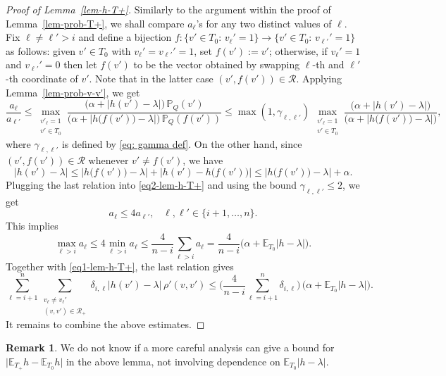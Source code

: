 \documentclass[12pt]{article}
\theoremstyle{definition}
\newtheorem{Remark}[theorem]{Remark}
\theoremstyle{plain}
\newcommand{\E}{\mathbb{E}}
\def\Prob{{\mathbb P}}
\def\relation{{\mathcal R}}
\begin{document}
\begin{proof}[Proof of Lemma~\ref{lem-h-T+}]
Similarly to the argument within the proof of Lemma~\ref{lem-prob-T+}, we shall compare 
$a_\ell$'s for any two distinct values of $\ell$. Fix $\ell\neq\ell'>i$ and define a bijection 
$f: \{v'\in T_0:\, v_\ell'=1\}\to \{v'\in T_0:\, v_{\ell'}'=1\}$ as follows: given $v'\in T_0$ with $v_\ell'=v_{\ell'}'=1$,
set $f(v'):=v'$; otherwise, if $v_\ell'=1$ and $v_{\ell'}'=0$ then
let $f(v')$ to be the vector obtained by swapping $\ell$-th and $\ell'$-th coordinate of $v'$. 
Note that in the latter case $(v',f(v'))\in \relation$.
Applying Lemma~\ref{lem-prob-v-v'}, we get
\begin{equation}\label{eq2-lem-h-T+}
\frac{a_\ell}{a_{\ell'}}\leq
 \max_{\substack{v'_\ell=1\\v'\in T_0}} 
 \frac{\big(\alpha+\big\vert h(v')-\lambda\big\vert\big)\, \Prob_Q(v')}{\big(\alpha+\big\vert h\big(f(v')\big)-\lambda\big\vert\big)\, \Prob_Q(f(v'))}
 \leq \max(1,\gamma_{\ell, \ell'}) \, \max_{\substack{v'_\ell=1\\v'\in T_0}} 
 \frac{\big(\alpha+\big\vert h(v')-\lambda\big\vert\big)}{\big(\alpha+\big\vert h\big(f(v')\big)-\lambda\big\vert\big)},
\end{equation}
where $\gamma_{\ell,\ell'}$ is defined by \eqref{eq: gamma def}.
On the other hand, since $(v',f(v'))\in \relation$ whenever $v'\neq f(v')$, we have 
$$
\big\vert h(v')-\lambda\big\vert\leq \big\vert h\big(f(v')\big)-\lambda\big\vert +
\big\vert h(v')-h\big(f(v')\big)\big\vert \leq \big\vert h\big(f(v')\big)-\lambda\big\vert +\alpha.
$$
Plugging the last relation into \eqref{eq2-lem-h-T+} and using the bound $\gamma_{\ell,\ell'}\leq 2$, we get 
$$
a_\ell\leq 4a_{\ell'},\;\;\;\ell,\ell'\in\{i+1,\ldots,n\}.
$$
This implies
$$
\max_{\ell>i} a_\ell\leq 4\min_{\ell>i} a_\ell \leq \frac{4}{n-i}\sum_{\ell>i} a_\ell
=\frac{4}{n-i}\big( \alpha+\E_{T_0} \vert h-\lambda\vert\big).
$$
Together with \eqref{eq1-lem-h-T+}, the last relation gives
$$\sum_{\ell=i+1}^n \sum_{\substack{v_\ell\neq v_{\ell}'\\(v,v')\in \relation_+}} 
\delta_{i,\ell}\big\vert h(v')-\lambda\big\vert\,\rho'(v,v')
\leq
\Big(\frac{4}{n-i} \sum_{\ell=i+1}^n \delta_{i,\ell}\Big)\, \big(\alpha+\E_{T_0} \vert h-\lambda\vert\big).
$$
It remains to combine the above estimates.
\end{proof}

\begin{Remark}
We do not know if a more careful analysis can give a bound for $\vert \E_{T_+} h-\E_{T_0} h\vert$
in the above lemma, not involving dependence on $\E_{T_0}|h-\lambda|$.
\end{Remark}
\end{document}
